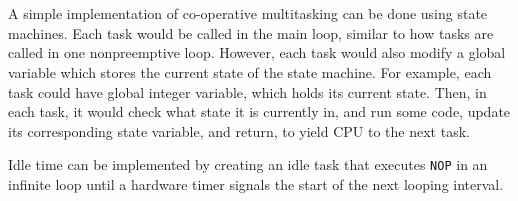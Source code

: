 \section{}
A simple implementation of co-operative multitasking can be done using state
machines. Each task would be called in the main loop, similar to how tasks are
called in one nonpreemptive loop. However, each task would also modify a global
variable which stores the current state of the state machine. 
For example, each task could have global integer variable, which holds its
current state. Then, in each task, it would check what state it is currently in,
and run some code, update its corresponding state variable, and return, to yield
CPU to the next task.


Idle time can be implemented by creating an idle task that executes \texttt{NOP}
in an infinite loop until a hardware timer signals the start of the next looping
interval. 
